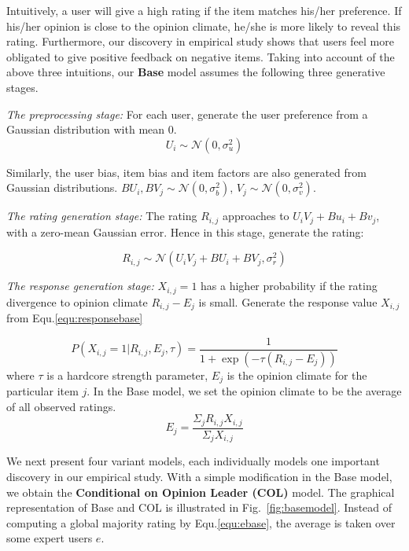 \documentclass[sigconf]{acmart}
\begin{document}
Intuitively, a user will give a high rating if the item matches his/her preference. If his/her opinion is close to the opinion climate, he/she is more likely to reveal this rating. Furthermore, our  discovery in  empirical study shows that users feel more obligated to give positive feedback on negative items. Taking into account of the above three intuitions, our \textbf{Base} model assumes the following three generative stages.

\textit{The preprocessing stage:} For each user, generate the user preference from a Gaussian distribution with mean $0$.
\begin{equation}\label{equ:preferencebase}
U_i \sim \mathcal{N}(0,\sigma_u^2)
\end{equation}

Similarly, the user bias, item bias and item factors are also generated from Gaussian distributions. $BU_i, BV_j \sim \mathcal{N}(0,\sigma_b^2)$,  $V_j \sim \mathcal{N}(0,\sigma_v^2)$.

\textit{The rating generation stage:} The rating $R_{i,j}$ approaches to $U_iV_j+Bu_i + Bv_j $, with a  zero-mean Gaussian error. Hence in this stage, generate the rating:

\begin{equation}\label{equ:rating}
R_{i,j} \sim \mathcal{N}(U_iV_j+BU_i+BV_j, \sigma_r^2)
\end{equation}

\textit{The response generation stage:} $X_{i,j}=1$ has a higher probability if the rating divergence to opinion climate $R_{i,j}-E_j$ is small. Generate the response value $X_{i,j}$ from Equ.\ref{equ:responsebase}

\begin{equation}\label{equ:responsebase}
 P(X_{i,j}=1|R_{i,j},E_j,\tau)=\frac{1}{1+\exp{(-\tau(R_{i,j}-E_j))}}
\end{equation}
 where $\tau$ is a hardcore strength parameter, $E_j$ is the opinion climate for the particular item $j$. In the Base model, we set the opinion climate to be the average of all observed ratings.
\begin{equation}\label{equ:ebase}
 E_j=\frac{\Sigma_jR_{i,j}X_{i,j}}{\Sigma_j X_{i,j}}
\end{equation}


We next present four variant models, each individually models one important discovery in our empirical study. With a simple modification in the Base model, we obtain the \textbf{Conditional on Opinion Leader (COL)} model. The graphical representation of Base and COL is illustrated in Fig.~\ref{fig:basemodel}. Instead of computing a global majority rating by Equ.\ref{equ:ebase}, the average is taken over some expert users $e$.
\end{document}
